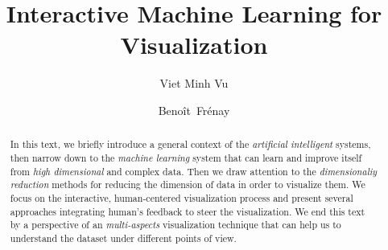 \documentclass[sigconf,natbib=false]{acmart}
\begin{document}
\title{Interactive Machine Learning for Visualization}

\author{Viet Minh Vu}

\author{Beno\^it~Fr\'enay}

\renewcommand{\shortauthors}{V. M. Vu}

\begin{abstract}
In this text, we briefly introduce a general context of the \emph{artificial intelligent} systems, then narrow down to the \emph{machine learning} system that can learn and improve itself from \emph{high dimensional} and complex data. Then we draw attention to the \emph{dimensionaliy reduction} methods for reducing the dimension of data in order to visualize them. We focus on the interactive, human-centered visualization process and present several approaches integrating human's feedback to steer the visualization. We end this text by a perspective of an \emph{multi-aspects} visualization technique that can help us to understand the dataset under different points of view.

\end{abstract}


\maketitle



\printbibliography
\end{document}
